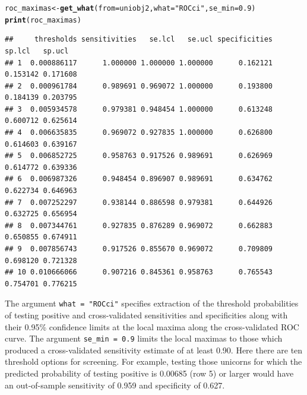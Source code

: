 \documentclass[11pt]{report}\usepackage[]{graphicx}\usepackage[]{xcolor}
\makeatletter
\newcommand{\hlnum}[1]{\textcolor[rgb]{0.686,0.059,0.569}{#1}}%
\newcommand{\hlstr}[1]{\textcolor[rgb]{0.192,0.494,0.8}{#1}}%
\newcommand{\hlstd}[1]{\textcolor[rgb]{0.345,0.345,0.345}{#1}}%
\newcommand{\hlkwb}[1]{\textcolor[rgb]{0.69,0.353,0.396}{#1}}%
\newcommand{\hlkwc}[1]{\textcolor[rgb]{0.333,0.667,0.333}{#1}}%
\newcommand{\hlkwd}[1]{\textcolor[rgb]{0.737,0.353,0.396}{\textbf{#1}}}%
\newenvironment{kframe}{%
 \def\at@end@of@kframe{}%
 \ifinner\ifhmode%
  \def\at@end@of@kframe{\end{minipage}}%
  \begin{minipage}{\columnwidth}%
 \fi\fi%
 \def\FrameCommand##1{\hskip\@totalleftmargin \hskip-\fboxsep
 \colorbox{shadecolor}{##1}\hskip-\fboxsep
     \hskip-\linewidth \hskip-\@totalleftmargin \hskip\columnwidth}%
 \MakeFramed {\advance\hsize-\width
   \@totalleftmargin\z@ \linewidth\hsize
   \@setminipage}}%
 {\par\unskip\endMakeFramed%
 \at@end@of@kframe}
\newenvironment{knitrout}{}{} %
\makeatother
\begin{document}
\begin{knitrout}
\color{fgcolor}\begin{kframe}
\begin{alltt}
\hlstd{roc_maximas} \hlkwb{<-} \hlkwd{get_what}\hlstd{(}\hlkwc{from} \hlstd{= uniobj2,} \hlkwc{what} \hlstd{=} \hlstr{"ROCci"}\hlstd{,} \hlkwc{se_min} \hlstd{=} \hlnum{0.9}\hlstd{)}
\hlkwd{print}\hlstd{(roc_maximas)}
\end{alltt}
\begin{verbatim}
##     thresholds sensitivities   se.lcl   se.ucl specificities   sp.lcl   sp.ucl
## 1  0.000886117      1.000000 1.000000 1.000000      0.162121 0.153142 0.171608
## 2  0.000961784      0.989691 0.969072 1.000000      0.193800 0.184139 0.203795
## 3  0.005934578      0.979381 0.948454 1.000000      0.613248 0.600712 0.625614
## 4  0.006635835      0.969072 0.927835 1.000000      0.626800 0.614603 0.639167
## 5  0.006852725      0.958763 0.917526 0.989691      0.626969 0.614772 0.639336
## 6  0.006987326      0.948454 0.896907 0.989691      0.634762 0.622734 0.646963
## 7  0.007252297      0.938144 0.886598 0.979381      0.644926 0.632725 0.656954
## 8  0.007344761      0.927835 0.876289 0.969072      0.662883 0.650855 0.674911
## 9  0.007856743      0.917526 0.855670 0.969072      0.709809 0.698120 0.721328
## 10 0.010666066      0.907216 0.845361 0.958763      0.765543 0.754701 0.776215
\end{verbatim}
\end{kframe}
\end{knitrout}

The argument \verb|what = "ROCci"| specifies extraction of the threshold
probabilities of testing positive and cross-validated sensitivities
and specificities along with their 0.95\% confidence limits at the
local maxima along the cross-validated ROC curve. The argument
\verb|se_min = 0.9| limits the local maximas to those which produced a
cross-validated sensitivity estimate of at least 0.90. Here there are
ten threshold options for screening.  For example, testing those unicorns for
which the predicted probability of testing positive is 0.00685 (row 5) or
larger would have an out-of-sample sensitivity of 0.959 and
specificity of 0.627.
\end{document}
